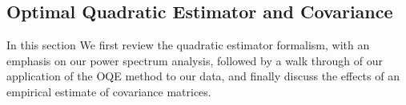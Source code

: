 \documentclass[twocolumn,numberedappendix]{emulateapj} \shorttitle{PSA64}
\begin{document}




\subsection{Optimal Quadratic Estimator and Covariance}\label{sec:oqe}
In this section We first
review the quadratic estimator formalism, with an emphasis on our power
spectrum analysis, followed by a walk through of our application of the OQE
method to our data, and finally discuss the effects of an empirical estimate of
covariance matrices.
\end{document}
